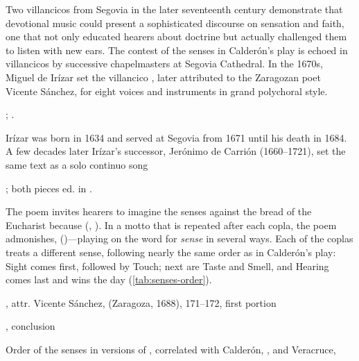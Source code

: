 Two villancicos from Segovia in the later seventeenth century demonstrate that
devotional music could present a sophisticated discourse on sensation and faith,
one that not only educated hearers about doctrine but actually challenged them
to listen with new ears.  
The contest of the senses in Calderón's play is echoed in villancicos by
successive chapelmasters at Segovia Cathedral.
In the 1670s, Miguel de Irízar set the villancico , later attributed to the Zaragozan poet Vicente Sánchez,
for eight voices and instruments in grand polychoral style.%
\begin{Footnote}
   ; \autocite{LopezCalo:Segovia}.
\end{Footnote}
Irízar was born in 1634 and served at Segovia from 1671 until his death in 1684.
A few decades later Irízar's successor, Jerónimo de Carrión (1660--1721), set
the same text as a solo continuo song%
\begin{Footnote}
    ; both pieces ed. in \autocite[133--152]{Cashner:WLSCM32}.
\end{Footnote}

The poem invites hearers to imagine the senses 
against the bread of the Eucharist because  (,
).%
    \Autocite[171--172]{Sanchez:LiraPoetica}
In a motto that is repeated after each copla, the poem admonishes,  ()---playing
on the word for \emph{sense} in several ways.  
Each of the coplas treats a different sense, following nearly the same order as
in Calderón's play: Sight comes first, followed by Touch; next are Taste and
Smell, and Hearing comes last and wins the day (\cref{tab:senses-order}).

{, attr. Vicente Sánchez,
 (Zaragoza, 1688), 171--172, first portion}

{, conclusion}

{Order of the senses in versions of , correlated with
Calderón, , and Veracruce, } 

